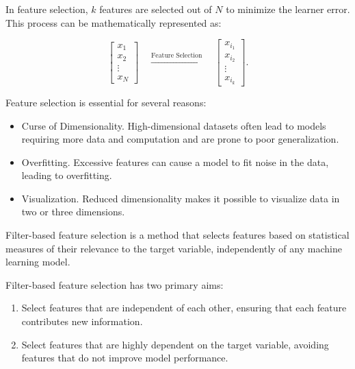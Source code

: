 	In feature selection, $k$ features are selected out of $N$ to minimize the learner error. This process can be mathematically represented as:
	
	$$
	\begin{bmatrix} 
		x_1 \\ x_2 \\ \vdots \\ x_N 
	\end{bmatrix} 
	\quad
	\xrightarrow{\text{Feature Selection}} 
	\quad 
	\begin{bmatrix} 
		x_{i_1} \\ x_{i_2} \\ \vdots \\ x_{i_k} 
	\end{bmatrix}.
	$$
	
	Feature selection is essential for several reasons:
	\begin{itemize}
		\item Curse of Dimensionality. High-dimensional datasets often lead to models requiring more data and computation and are prone to poor generalization.
		\item Overfitting. Excessive features can cause a model to fit noise in the data, leading to overfitting.
		\item Visualization. Reduced dimensionality makes it possible to visualize data in two or three dimensions.
	\end{itemize}
	
	
	Filter-based feature selection is a method that selects features based on statistical measures of their relevance to the target variable, independently of any machine learning model.
	
	Filter-based feature selection has two primary aims:
	\begin{enumerate}
		\item Select features that are independent of each other, ensuring that each feature contributes new information.
		\item Select features that are highly dependent on the target variable, avoiding features that do not improve model performance.
	\end{enumerate}
	
